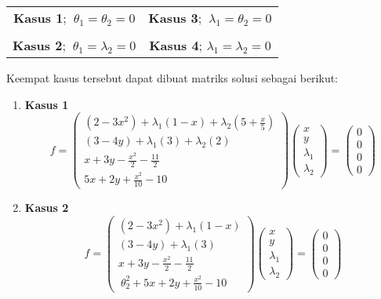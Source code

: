 \documentclass{article}
\begin{document}
\begin{center}
\begin{tabular}{c|c}
     \textbf{Kasus 1}; \(\ \theta_1=\theta_2=0\) &  \textbf{Kasus 3}; \(\ \lambda_1=\theta_2=0\)\\
     \\
     \textbf{Kasus 2}; \(\ \theta_1=\lambda_2=0\) &  \textbf{Kasus 4}; \(\lambda_1=\lambda_2=0\)
\end{tabular}
\end{center}
\bigskip
Keempat kasus tersebut dapat dibuat matriks solusi sebagai berikut:
\begin{enumerate}
    \item \textbf{Kasus 1}
    \subitem 
    \begin{displaymath}
    f=
    \begin{pmatrix}
    (2-3x^2)+\lambda_1(1-x)+\lambda_2(5+\frac{x}{5})\\
    (3-4y)+\lambda_1(3)+\lambda_2(2)\\
    x+3y-\frac{x^2}{2}-\frac{11}{2}\\
    5x+2y+\frac{x^2}{10}-10
    \end{pmatrix}
    \begin{pmatrix}
        x\\y\\ \lambda_1 \\ \lambda_2
    \end{pmatrix}=
    \begin{pmatrix}
        0 \\ 0 \\ 0 \\ 0
    \end{pmatrix}
    \end{displaymath}
    
    \item \textbf{Kasus 2}
    \subitem 
    \begin{displaymath}
    f=
    \begin{pmatrix}
    (2-3x^2)+\lambda_1(1-x)\\
    (3-4y)+\lambda_1(3)\\
    x+3y-\frac{x^2}{2}-\frac{11}{2}\\
    \ \theta_2^2+5x+2y+\frac{x^2}{10}-10 \
    \end{pmatrix}
    \begin{pmatrix}
        x\\y\\ \lambda_1 \\ \lambda_2
    \end{pmatrix}=
    \begin{pmatrix}
        0 \\ 0 \\ 0 \\ 0
    \end{pmatrix}
    \end{displaymath}
    

\end{enumerate}
\end{document}
